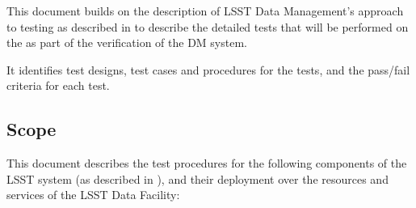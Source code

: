 \documentclass[DM,lsstdraft,STS,toc]{lsstdoc}
\begin{document}
This document builds on the description of LSST Data Management's approach to testing as described in  to describe the detailed tests that will be performed on the \product{} as part of the verification of the DM system.

It identifies test designs, test cases and procedures for the tests, and the pass/fail criteria for each test.

\subsection{Scope}
\label{sec:scope}

This document describes the test procedures for the following components of the LSST system (as described in ), and their deployment over the resources and services of the LSST Data Facility:
\end{document}
